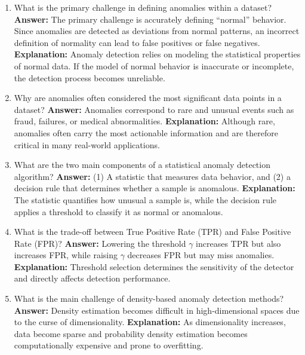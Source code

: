 \documentclass{article}
\begin{document}
\begin{enumerate}

\item What is the primary challenge in defining anomalies within a dataset?\newline
\textbf{Answer:} The primary challenge is accurately defining ``normal'' behavior. Since anomalies are detected as deviations from normal patterns, an incorrect definition of normality can lead to false positives or false negatives.\newline
\textbf{Explanation:} Anomaly detection relies on modeling the statistical properties of normal data. If the model of normal behavior is inaccurate or incomplete, the detection process becomes unreliable.

\item Why are anomalies often considered the most significant data points in a dataset?\newline
\textbf{Answer:} Anomalies correspond to rare and unusual events such as fraud, failures, or medical abnormalities.\newline
\textbf{Explanation:} Although rare, anomalies often carry the most actionable information and are therefore critical in many real-world applications.

\item What are the two main components of a statistical anomaly detection algorithm?\newline
\textbf{Answer:} (1) A statistic that measures data behavior, and (2) a decision rule that determines whether a sample is anomalous.\newline
\textbf{Explanation:} The statistic quantifies how unusual a sample is, while the decision rule applies a threshold to classify it as normal or anomalous.

\item What is the trade-off between True Positive Rate (TPR) and False Positive Rate (FPR)?\newline
\textbf{Answer:} Lowering the threshold $\gamma$ increases TPR but also increases FPR, while raising $\gamma$ decreases FPR but may miss anomalies.\newline
\textbf{Explanation:} Threshold selection determines the sensitivity of the detector and directly affects detection performance.

\item What is the main challenge of density-based anomaly detection methods?\newline
\textbf{Answer:} Density estimation becomes difficult in high-dimensional spaces due to the curse of dimensionality.\newline
\textbf{Explanation:} As dimensionality increases, data become sparse and probability density estimation becomes computationally expensive and prone to overfitting.


\end{enumerate}
\end{document}
